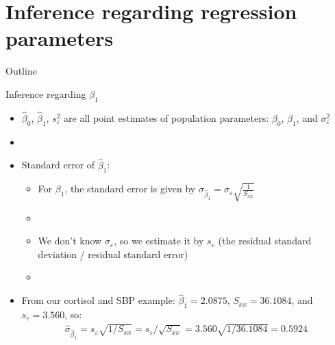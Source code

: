 \documentclass[xcolor=dvipsnames]{beamer}
\begin{document}
\section{Inference regarding regression parameters}
\begin{frame}{Outline}
\tableofcontents[currentsection,subsectionstyle=show/shaded/hide]
\end{frame}

\begin{frame}{Inference regarding $\beta_1$}
	\begin{itemize}
		\item $\hat{\beta}_0$, $\hat{\beta}_1$, $s^2_{\varepsilon}$ are all point estimates of population parameters: $\beta_0$, $\beta_1$, and $\sigma^2_{\varepsilon}$ \pause
		\item[]
		\item Standard error of $\hat{\beta}_1$: \pause
		\begin{itemize}
			\item For $\beta_1$, the standard error is given by $\sigma_{\hat{\beta}_1} = \sigma_{\varepsilon} \sqrt{\frac{1}{S_{xx}}}$ \pause
			\item[]
			\item We don't know $\sigma_{\varepsilon}$, so we estimate it by $s_{\varepsilon}$ (the residual standard deviation / residual standard error) \pause
			\item[]
		\end{itemize}
	\item From our cortisol and SBP example: $\hat{\beta}_1 = 2.0875$, $S_{xx} = 36.1084$, and $s_{\varepsilon}=3.560$, so: \pause
	\begin{gather*}
		\hat{\sigma}_{\hat{\beta}_1} = s_{\varepsilon} \sqrt{1/S_{xx}} = {s_{\varepsilon} / \sqrt{S_{xx}}}= 3.560 \sqrt{1/36.1084} = 0.5924
	\end{gather*}
	\end{itemize}
\end{frame}
\end{document}
